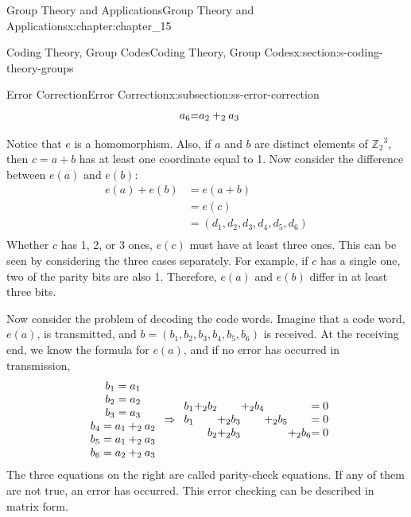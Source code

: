 \documentclass[oneside,10pt,]{book}
\numberwithin{equation}{section}
\begin{document}
\begin{chapterptx}{Group Theory and Applications}{}{Group Theory and Applications}{}{}{x:chapter:chapter_15}
\begin{sectionptx}{Coding Theory, Group Codes}{}{Coding Theory, Group Codes}{}{}{x:section:s-coding-theory-groups}
\begin{subsectionptx}{Error Correction}{}{Error Correction}{}{}{x:subsection:ss-error-correction}
\begin{equation*}
\begin{array}{r@{}r@{}r@{}r@{}r@{}r@{}r@{}}
a_6  &= &  &              &  a_2   &{}+_2{}  & a_3  \\
\end{array}
\end{equation*}
%
\par
Notice that \(e\) is a homomorphism.  Also, if \(a\) and \(b\) are distinct elements of \(\mathbb{Z}_2{}^3\), then \(c = a + b\) has at least one coordinate equal to 1. Now consider the difference between \(e(a)\) and \(e(b)\):%
\begin{equation*}
\begin{split}
e(a) + e(b) &= e(a + b) \\
& = e(c)\\
& = \left(d_1, d_2, d_3, d_4, d_5, d_6\right)\\
\end{split}
\end{equation*}
Whether \(c\) has 1, 2, or 3 ones, \(e(c)\) must have at least three ones.  This can be seen by considering the three cases separately.  For example, if \(c\) has a single one, two of the parity bits are also 1.  Therefore, \(e(a)\) and \(e(b)\) differ in at least three bits.%
\par
Now consider the problem of decoding the code words. Imagine that a code word, \(e(a)\), is transmitted, and \(b= \left(b_1, b_2, b_3,b_4, b_5, b_6\right)\) is received. At the receiving end, we know the formula for \(e(a)\), and if no error has occurred in transmission,%
\begin{equation*}
\begin{array}{c}
b_1= a_1 \\
b_2=a_2 \\
b_3=a_3 \\
b_4=a_1+_2a_2 \\
b_5=a_1+_2a_3 \\
b_6=a_2+_2a_3 \\
\end{array}
\Rightarrow 
\begin{array}{r@{}r@{}r@{}r@{}r@{}r@{}r@{}r@{}r@{}r@{}r@{}r@{}}
b_1 & +_2 & b_2 &      &   &+_2& b_4&    &     &    &   &=0\\
b_1 &     &     & +_2  &b_3&   &    & +_2& b_5 &    &   &=0\\
&     & b_2 & +_2  &b_3&   &    &    &     &+_2 &b_6&=0\\
\end{array}
\end{equation*}
The three equations on the right are called parity-check equations. If any of them are not true, an error has occurred. This error checking can be described in matrix form.%

\end{subsectionptx}
\end{sectionptx}
\end{chapterptx}
\end{document}
